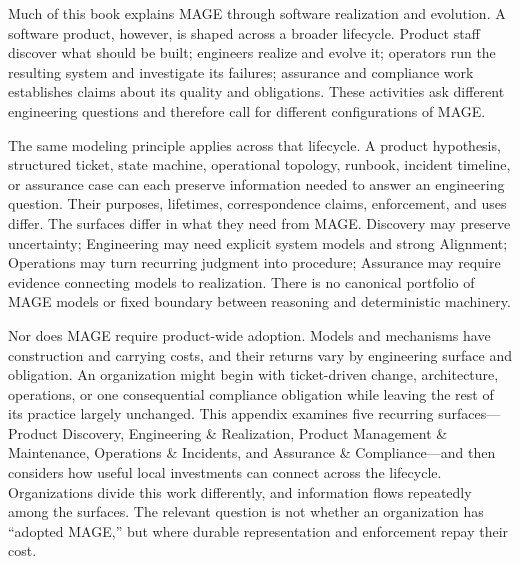 

Much of this book explains MAGE through software realization and evolution. A software product, however, is shaped across a broader lifecycle. Product staff discover what should be built; engineers realize and evolve it; operators run the resulting system and investigate its failures; assurance and compliance work establishes claims about its quality and obligations. These activities ask different engineering questions and therefore call for different configurations of MAGE.

The same modeling principle applies across that lifecycle. A product hypothesis, structured ticket, state machine, operational topology, runbook, incident timeline, or assurance case can each preserve information needed to answer an engineering question. Their purposes, lifetimes, correspondence claims, enforcement, and uses differ. The surfaces differ in what they need from MAGE. Discovery may preserve uncertainty; Engineering may need explicit system models and strong Alignment; Operations may turn recurring judgment into procedure; Assurance may require evidence connecting models to realization. There is no canonical portfolio of MAGE models or fixed boundary between reasoning and deterministic machinery.

Nor does MAGE require product-wide adoption. Models and mechanisms have construction and carrying costs, and their returns vary by engineering surface and obligation. An organization might begin with ticket-driven change, architecture, operations, or one consequential compliance obligation while leaving the rest of its practice largely unchanged. This appendix examines five recurring surfaces---Product Discovery, Engineering \& Realization, Product Management \& Maintenance, Operations \& Incidents, and Assurance \& Compliance---and then considers how useful local investments can connect across the lifecycle. Organizations divide this work differently, and information flows repeatedly among the surfaces. The relevant question is not whether an organization has ``adopted MAGE,'' but where durable representation and enforcement repay their cost.
